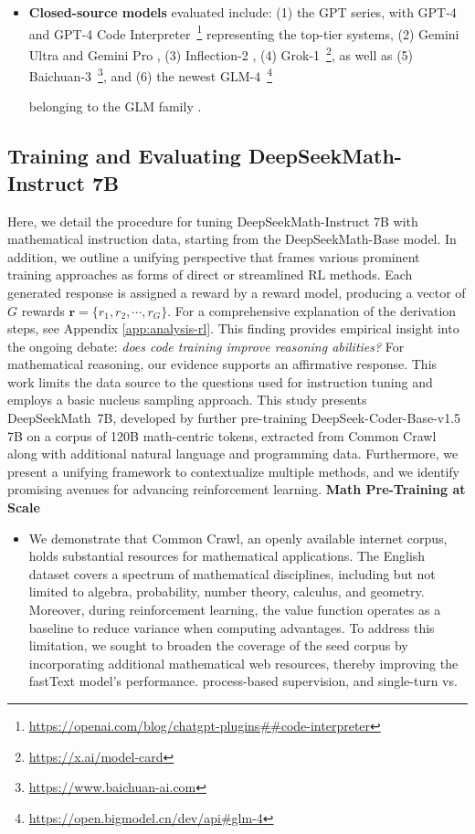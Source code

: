 \begin{itemize}[topsep=0pt]
    \item \textbf{Closed-source models} evaluated include: (1) the GPT series, with GPT-4 \citep{gpt4} and GPT-4 Code Interpreter~\footnote{\url{https://openai.com/blog/chatgpt-plugins\#\#code-interpreter}} representing the top-tier systems, (2) Gemini Ultra and Gemini Pro \citep{gemini}, (3) Inflection-2 \citep{inflection-2}, (4) Grok-1~\footnote{\url{https://x.ai/model-card}}, as well as (5) Baichuan-3~\footnote{\url{https://www.baichuan-ai.com}}, and (6) the newest GLM-4~\footnote{\url{https://open.bigmodel.cn/dev/api\#glm-4}}

    belonging to the GLM family \citep{glm}. \end{itemize}

\subsection{Training and Evaluating DeepSeekMath-Instruct 7B}

Here, we detail the procedure for tuning DeepSeekMath-Instruct 7B with mathematical instruction data, starting from the DeepSeekMath-Base model. In addition, we outline a unifying perspective that frames various prominent training approaches as forms of direct or streamlined RL methods. Each generated response is assigned a reward by a reward model, producing a vector of $G$ rewards $\mathbf{r}=\{r_1, r_2, \cdots, r_G\}$. For a comprehensive explanation of the derivation steps, see Appendix \ref{app:analysis-rl}. This finding provides empirical insight into the ongoing debate: \textit{does code training improve reasoning abilities?} For mathematical reasoning, our evidence supports an affirmative response. This work limits the data source to the questions used for instruction tuning and employs a basic nucleus sampling approach. This study presents DeepSeekMath~7B, developed by further pre-training DeepSeek-Coder-Base-v1.5 7B on a corpus of 120B math-centric tokens, extracted from Common Crawl along with additional natural language and programming data. Furthermore, we present a unifying framework to contextualize multiple methods, and we identify promising avenues for advancing reinforcement learning. \textbf{Math Pre-Training at Scale}

\begin{itemize}[topsep=0pt]
    \item We demonstrate that Common Crawl, an openly available internet corpus, holds substantial resources for mathematical applications. The English dataset covers a spectrum of mathematical disciplines, including but not limited to algebra, probability, number theory, calculus, and geometry. Moreover, during reinforcement learning, the value function operates as a baseline to reduce variance when computing advantages. To address this limitation, we sought to broaden the coverage of the seed corpus by incorporating additional mathematical web resources, thereby improving the fastText model's performance. process-based supervision, and single-turn vs. \end{itemize}

